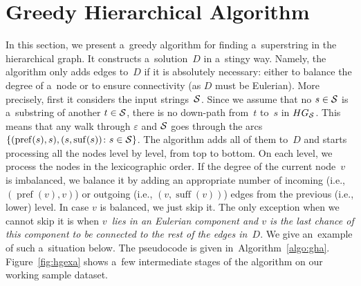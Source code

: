 \documentclass[11pt]{article}
\DeclareMathOperator{\pref}{pref}
\DeclareMathOperator{\suff}{suff}
\begin{document}
\section{Greedy Hierarchical Algorithm}
In this section, we present a~greedy algorithm for
finding a~superstring in the hierarchical graph. 
It constructs a~solution~$D$ in a~stingy way. 
Namely, the algorithm only adds edges to~$D$ 
if it is absolutely necessary: either to balance the degree of a~node or to ensure connectivity 
(as $D$ must be Eulerian). 
More precisely, first it considers the input
strings~${\cal S}$. Since we assume that 
no $s \in {\cal S}$ is a~substring of another 
$t \in {\cal S}$, there is no down-path from~$t$ to~$s$ in $HG_{\cal S}$. 
This means that any walk through $\varepsilon$ and ${\cal S}$ goes through the arcs $\{(\operatorname{pref}(s), s), (s, \operatorname{suf}(s)) \colon s \in {\cal S}\}$. The algorithm adds all of them to~$D$ and starts processing all the nodes level by level, from top to bottom. On each level, we process the nodes in the lexicographic order. If the degree of the current node~$v$ is imbalanced, we balance it by adding an appropriate number of incoming (i.e., $(\pref(v),v)$) or outgoing (i.e., $(v, \suff(v))$) edges from the previous (i.e., lower) level. In case $v$ is balanced, we just skip it. The only exception when we cannot skip it is when {\em $v$~lies in an Eulerian component and $v$ is the last chance of this component to be connected to the rest of the edges in~$D$}. We give an~example of such a~situation below. The pseudocode is given in~Algorithm~\ref{algo:gha}. Figure~\ref{fig:hgexa} shows a~few intermediate stages of the algorithm on our working sample dataset.
\end{document}
